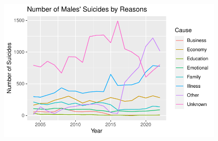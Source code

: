 \documentclass[
  11pt,
  a4paper,
  DIV=11,
  numbers=noendperiod]{scrartcl}
\begin{document}
\begin{figure}[H]

{\centering \includegraphics{analysis_files/figure-pdf/unnamed-chunk-15-1.pdf}

}

\end{figure}
\end{document}
